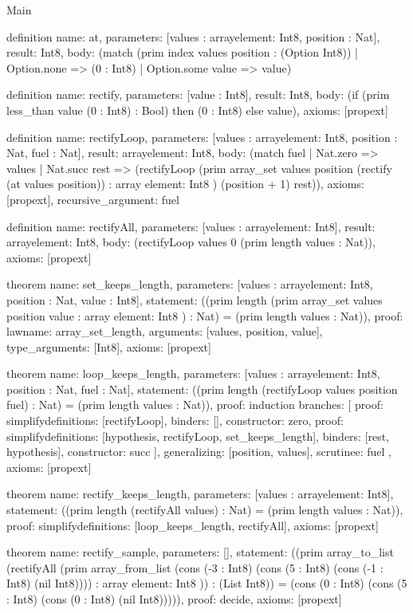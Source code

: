 \begin{lexlean}{Main}
\begin{semanticmodule}
definition{
  name: at,
  parameters: [values : array{element: Int8}, position : Nat],
  result: Int8,
  body: (match (prim index values position : (Option Int8))
    | Option.none => (0 : Int8)
    | Option.some value => value)
}

definition{
  name: rectify,
  parameters: [value : Int8],
  result: Int8,
  body: (if (prim less_than value (0 : Int8) : Bool) then (0 : Int8) else value),
  axioms: [propext]
}

definition{
  name: rectifyLoop,
  parameters: [values : array{element: Int8}, position : Nat, fuel : Nat],
  result: array{element: Int8},
  body: (match fuel
    | Nat.zero => values
    | Nat.succ rest => (rectifyLoop (prim array_set values position (rectify (at values position)) : array{
      element: Int8
    }) (position + 1) rest)),
  axioms: [propext],
  recursive_argument: fuel
}

definition{
  name: rectifyAll,
  parameters: [values : array{element: Int8}],
  result: array{element: Int8},
  body: (rectifyLoop values 0 (prim length values : Nat)),
  axioms: [propext]
}

theorem{
  name: set_keeps_length,
  parameters: [values : array{element: Int8}, position : Nat, value : Int8],
  statement: ((prim length (prim array_set values position value : array{
    element: Int8
  }) : Nat) = (prim length values : Nat)),
  proof: law{name: array_set_length, arguments: [values, position, value], type_arguments: [Int8]},
  axioms: [propext]
}

theorem{
  name: loop_keeps_length,
  parameters: [values : array{element: Int8}, position : Nat, fuel : Nat],
  statement: ((prim length (rectifyLoop values position fuel) : Nat) = (prim length values : Nat)),
  proof: induction{
    branches: [
      {proof: simplify{definitions: [rectifyLoop]}, binders: [], constructor: zero},
      {
        proof: simplify{definitions: [hypothesis, rectifyLoop, set_keeps_length]},
        binders: [rest, hypothesis],
        constructor: succ
      }
    ],
    generalizing: [position, values],
    scrutinee: fuel
  },
  axioms: [propext]
}

theorem{
  name: rectify_keeps_length,
  parameters: [values : array{element: Int8}],
  statement: ((prim length (rectifyAll values) : Nat) = (prim length values : Nat)),
  proof: simplify{definitions: [loop_keeps_length, rectifyAll]},
  axioms: [propext]
}

theorem{
  name: rectify_sample,
  parameters: [],
  statement: ((prim array_to_list (rectifyAll (prim array_from_list (cons (-3 : Int8) (cons (5 : Int8) (cons (-1 : Int8) (nil Int8)))) : array{
    element: Int8
  })) : (List Int8)) = (cons (0 : Int8) (cons (5 : Int8) (cons (0 : Int8) (nil Int8))))),
  proof: decide{},
  axioms: [propext]
}
\end{semanticmodule}
\end{lexlean}

